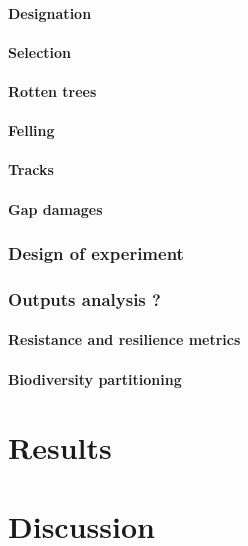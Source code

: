 \documentclass[]{article}
\let\oldparagraph\paragraph
\renewcommand{\paragraph}[1]{\oldparagraph{#1}\mbox{}}
\begin{document}
\paragraph{Designation}\label{designation}

\paragraph{Selection}\label{selection}

\paragraph{Rotten trees}\label{rotten-trees}

\paragraph{Felling}\label{felling}

\paragraph{Tracks}\label{tracks}

\paragraph{Gap damages}\label{gap-damages}

\subsubsection{Design of experiment}\label{design-of-experiment-1}

\subsubsection{Outputs analysis ?}\label{outputs-analysis}

\paragraph{Resistance and resilience
metrics}\label{resistance-and-resilience-metrics-1}

\paragraph{Biodiversity partitioning}\label{biodiversity-partitioning-1}

\section{Results}\label{results}

\section{Discussion}\label{discussion}


\end{document}
